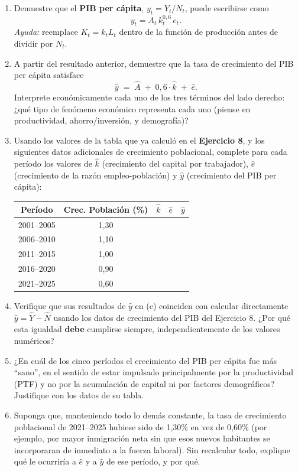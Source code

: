 \documentclass[11pt]{article}
\newenvironment{partes}
  {\begin{enumerate}[label=(\alph*), leftmargin=1.5cm]}
  {\end{enumerate}}
\newenvironment{tabladatos}
  {\begin{center}}
  {\end{center}}
\begin{document}
\begin{partes}
  \item Demuestre que el \textbf{PIB per cápita}, $y_t = Y_t/N_t$, puede escribirse como
  \[
  y_t = A_t\, k_t^{0,6}\, e_t.
  \]
  \emph{Ayuda:} reemplace $K_t = k_t L_t$ dentro de la función de producción antes de dividir por $N_t$.

  \item A partir del resultado anterior, demuestre que la tasa de crecimiento del PIB per cápita satisface
  \[
  \hat{y} \;=\; \hat{A} \;+\; 0{,}6\cdot\hat{k} \;+\; \hat{e}.
  \]
  Interprete económicamente cada uno de los tres términos del lado derecho: ¿qué tipo de fenómeno económico representa cada uno (piense en productividad, ahorro/inversión, y demografía)?

  \item Usando los valores de la tabla que ya calculó en el \textbf{Ejercicio 8}, y los siguientes datos adicionales de crecimiento poblacional, complete para cada período los valores de $\hat{k}$ (crecimiento del capital por trabajador), $\hat{e}$ (crecimiento de la razón empleo-población) y $\hat{y}$ (crecimiento del PIB per cápita):

  \begin{tabladatos}
  \begin{tabular}{ccccc}
  \hline\hline
  \textbf{Período} & \textbf{Crec. Población (\%)} & \textbf{$\hat{k}$} & \textbf{$\hat{e}$} & \textbf{$\hat{y}$} \\
  \hline
  2001--2005 & 1,30 & & & \\
  2006--2010 & 1,10 & & & \\
  2011--2015 & 1,00 & & & \\
  2016--2020 & 0,90 & & & \\
  2021--2025 & 0,60 & & & \\
  \hline\hline
  \end{tabular}
  \end{tabladatos}

  \item Verifique que sus resultados de $\hat{y}$ en (c) coinciden con calcular directamente $\hat{y} = \hat{Y} - \hat{N}$ usando los datos de crecimiento del PIB del Ejercicio 8. ¿Por qué esta igualdad \textbf{debe} cumplirse siempre, independientemente de los valores numéricos?

  \item ¿En cuál de los cinco períodos el crecimiento del PIB per cápita fue más ``sano'', en el sentido de estar impulsado principalmente por la productividad (PTF) y no por la acumulación de capital ni por factores demográficos? Justifique con los datos de su tabla.

  \item Suponga que, manteniendo todo lo demás constante, la tasa de crecimiento poblacional de 2021--2025 hubiese sido de 1,30\% en vez de 0,60\% (por ejemplo, por mayor inmigración neta sin que esos nuevos habitantes se incorporaran de inmediato a la fuerza laboral). Sin recalcular todo, explique qué le ocurriría a $\hat{e}$ y a $\hat{y}$ de ese período, y por qué.
\end{partes}
\end{document}

